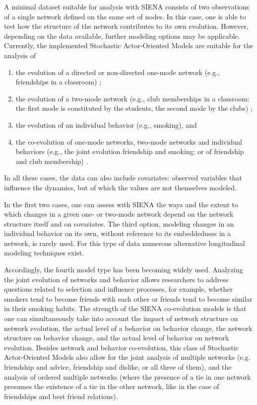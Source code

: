 \documentclass[a4paper,fleqn,11pt]{article}
\newcommand{\+}{\, + \,}
\newcommand{\SI}{{\sf SIENA }}
\newcommand{\saom}{{Stochastic Actor-Oriented Model}}
\begin{document}
A minimal dataset suitable for analysis with \SI consists of two observations of
a single network defined on the same set of nodes. In this case, one is able to
test how the structure of the network contributes to its own evolution.
However, depending on the data available, further modeling options may be
applicable. Currently, the implemented {\saom}s
are suitable for the analysis of
\begin{enumerate}
	\item	the evolution of a directed or non-directed one-mode network
        (e.g., friendships in a classroom) \citep{Snijders01};
	\item	the evolution of a two-mode network
        (e.g., club memberships in a classroom: the first mode
        is constituted by the students, the second mode by the clubs)
        \citep{KoskinenEdling2012};
	\item	the evolution of an individual behavior (e.g., smoking), and
	\item	the co-evolution of one-mode networks, two-mode networks and
        individual behaviors (e.g., the joint evolution friendship and smoking;
        or of friendship and club membership) \citep{SteglichEA10, SLT2013}.
\end{enumerate}
In all these cases, the data can also include covariates: observed variables
that influence the dynamics, but of which the values are not themselves
modeled.

In the first two cases, one can assess with \SI the ways and the extent
to which changes in a given one- or two-mode network depend on the network
structure itself and on covariates. The third option, modeling changes in
an individual behavior on its own, without reference to its embeddedness
in a network, is rarely used.
For this type of data numerous alternative longitudinal modeling techniques
exist.

Accordingly, the fourth model type has been becoming widely used.
Analyzing the joint evolution of networks and behavior allows researchers
to address questions related to selection and influence processes, for
example, whether smokers tend to become friends with each other or friends
 tend to become similar in their smoking habits. The strength of the \SI
co-evolution models is that one can simultaneously take into account
the impact of network structure on network evolution, the actual level
of a behavior on behavior change, the network structure on behavior change,
and the actual level of behavior on network evolution. Besides network and
behavior co-evolution, this class of {\saom}s
also allow for the joint analysis of multiple networks (e.g. friendship
and advice, friendship and dislike, or all three of them), and the
analysis of ordered multiple networks (where the presence of a tie
in one network presumes the existence of a tie in the other network,
like in the case of friendships and best friend relations).
\end{document}
